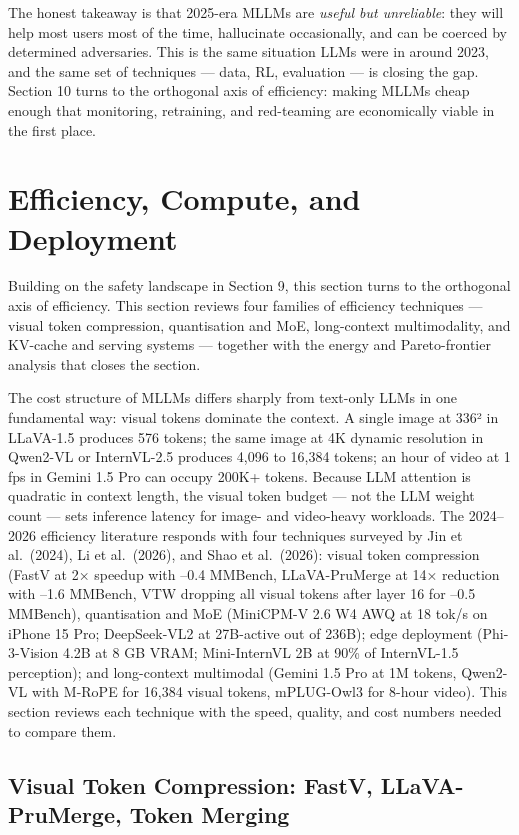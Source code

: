 \documentclass{article}
\begin{document}
The honest takeaway is that 2025-era MLLMs are \emph{useful but unreliable}: they will help most users most of the time, hallucinate occasionally, and can be coerced by determined adversaries. This is the same situation LLMs were in around 2023, and the same set of techniques --- data, RL, evaluation --- is closing the gap. Section 10 turns to the orthogonal axis of efficiency: making MLLMs cheap enough that monitoring, retraining, and red-teaming are economically viable in the first place.

\section{Efficiency, Compute, and Deployment}\label{efficiency-compute-and-deployment}

Building on the safety landscape in Section 9, this section turns to the orthogonal axis of efficiency. This section reviews four families of efficiency techniques --- visual token compression, quantisation and MoE, long-context multimodality, and KV-cache and serving systems --- together with the energy and Pareto-frontier analysis that closes the section.

The cost structure of MLLMs differs sharply from text-only LLMs in one fundamental way: visual tokens dominate the context. A single image at 336² in LLaVA-1.5 produces 576 tokens; the same image at 4K dynamic resolution in Qwen2-VL or InternVL-2.5 produces 4,096 to 16,384 tokens; an hour of video at 1 fps in Gemini 1.5 Pro can occupy 200K+ tokens. Because LLM attention is quadratic in context length, the visual token budget --- not the LLM weight count --- sets inference latency for image- and video-heavy workloads. The 2024--2026 efficiency literature responds with four techniques surveyed by Jin et al.~(2024), Li et al.~(2026), and Shao et al.~(2026): visual token compression (FastV at 2× speedup with --0.4 MMBench, LLaVA-PruMerge at 14× reduction with --1.6 MMBench, VTW dropping all visual tokens after layer 16 for --0.5 MMBench), quantisation and MoE (MiniCPM-V 2.6 W4 AWQ at 18 tok/s on iPhone 15 Pro; DeepSeek-VL2 at 27B-active out of 236B); edge deployment (Phi-3-Vision 4.2B at 8 GB VRAM; Mini-InternVL 2B at 90\% of InternVL-1.5 perception); and long-context multimodal (Gemini 1.5 Pro at 1M tokens, Qwen2-VL with M-RoPE for 16,384 visual tokens, mPLUG-Owl3 for 8-hour video). This section reviews each technique with the speed, quality, and cost numbers needed to compare them.

\subsection{Visual Token Compression: FastV, LLaVA-PruMerge, Token Merging}\label{visual-token-compression-fastv-llava-prumerge-token-merging}
\end{document}
